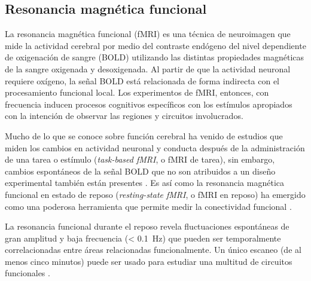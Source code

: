 \subsection{Resonancia magnética funcional}
La resonancia magnética funcional (fMRI) es una técnica de neuroimagen que mide la actividad cerebral por medio del contraste endógeno del nivel dependiente de oxigenación de sangre (BOLD) \parencite{Ogawa1993} utilizando las distintas propiedades magnéticas de la sangre oxigenada y desoxigenada.
Al partir de que la actividad neuronal requiere oxígeno, la señal BOLD está relacionada de forma indirecta con el procesamiento funcional local.
Los experimentos de fMRI, entonces, con frecuencia inducen procesos cognitivos específicos con los estímulos apropiados con la intención de observar las regiones y circuitos involucrados. \par
Mucho de lo que se conoce sobre función cerebral ha venido de estudios que miden los cambios en actividad neuronal y conducta después de la administración de una tarea o estímulo (\textit{task-based fMRI}, o fMRI de tarea), sin embargo, cambios espontáneos de la señal BOLD que no son atribuidos a un diseño experimental también están presentes \parencite{Fox2007}.
Es así como la resonancia magnética funcional en estado de reposo (\textit{resting-state fMRI}, o fMRI en reposo) ha emergido como una poderosa herramienta que permite medir la conectividad funcional \parencite{Biswal2010}.\par
La resonancia funcional durante el reposo revela fluctuaciones espontáneas de gran amplitud y baja frecuencia (\deactivatequoting\SI{< 0.1}{\hertz}\activatequoting) que pueden ser temporalmente correlacionadas entre áreas relacionadas funcionalmente.
Un único escaneo (de al menos cinco minutos) puede ser usado para estudiar una multitud de circuitos funcionales \parencite{Biswal2010}.

